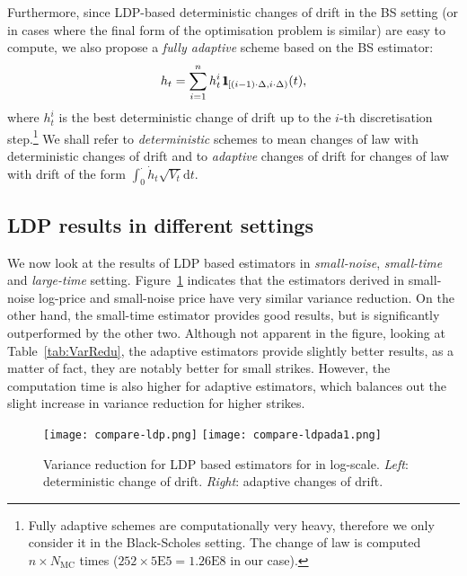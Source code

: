 \documentclass{amsart}[11pt]
\numberwithin{equation}{section}
\numberwithin{theorem}{subsection}
\numberwithin{proposition}{subsection}
\numberwithin{definition}{subsection}
\numberwithin{lemma}{subsection}
\numberwithin{assumption}{subsection}
\newcommand{\D}{\mathrm{d}}
\newcommand{\ind}{1\hspace{-2.1mm}{1}} %
\begin{document}
Furthermore, since LDP-based deterministic changes of drift in the BS setting (or in cases where the final form of the optimisation problem is similar) are easy to compute, we also propose a \textit{fully adaptive} scheme based on the BS estimator: 
$$h_t=\sum_{i=1}^{n} h^i_t \, \ind_{[(i-1)\cdot\Delta, i\cdot\Delta)}(t),$$
where $h^i_t$ is the best deterministic change of drift up to the $i$-th discretisation step.\footnote{Fully adaptive schemes are  computationally very heavy, therefore we only consider it in the Black-Scholes setting. 
The change of law is computed $n \times N_{\text{MC}}$ times ($252 \times 5\mathrm{E}5 = 1.26\mathrm{E}8$ in our case).} %
We shall refer to \textit{deterministic} schemes
to mean changes of law with deterministic changes of drift and to \textit{adaptive} changes of drift 
for changes of law with drift of the form $\int_{0}^{\cdot} \dot{h}_t\sqrt{V_t}\D t$.

\subsection{LDP results in different settings}
We now look at the results of LDP based estimators in \textit{small-noise}, \textit{small-time} and \textit{large-time} setting. Figure~\ref{fig:LDPvarianceRedu} indicates that the estimators derived in small-noise log-price and small-noise price have very similar variance reduction. On the other hand, the small-time estimator provides good results, but is significantly outperformed by the other two. Although not apparent in the figure, looking at Table~\ref{tab:VarRedu}, the adaptive estimators provide slightly better results, as a matter of fact, they are notably better for small strikes. However, the computation time is also higher for adaptive estimators, which balances out the slight increase in variance reduction for higher strikes.
\begin{figure}[H]
    \centering
    \texttt{[image: compare-ldp.png]}
    \texttt{[image: compare-ldpada1.png]}
    \caption{Variance reduction for LDP based estimators for in log-scale. \textit{Left}: deterministic change of drift. \textit{Right}: adaptive changes of drift.}\label{fig:LDPvarianceRedu}
\end{figure}
\end{document}
